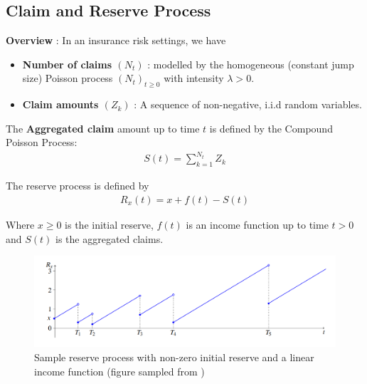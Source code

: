 \subsection{Claim and Reserve Process}
\textbf{Overview} : In an insurance risk settings, we have
\begin{itemize}
    \item \textbf{Number of claims $(N_t)$} : modelled by the homogeneous (constant jump size) Poisson process $(N_t)_{t\ge0}$ with intensity $\lambda > 0$.
    \item \textbf{Claim amounts $(Z_k)$} : A sequence of non-negative, i.i.d random variables.
\end{itemize}

\begin{definition}
    The \textbf{Aggregated claim} amount up to time $t$ is defined by the Compound Poisson Process:
    \begin{align*}
        S(t) = \sum_{k=1}^{N_t} Z_k
    \end{align*}
\end{definition}

\begin{definition}
    The reserve process is defined by
    \begin{align*}
        R_x(t) = x + f(t) - S(t)
    \end{align*}

    \noindent Where $x\ge0$ is the initial reserve, $f(t)$ is an income function up to time $t>0$ and $S(t)$ is the aggregated claims. 
\end{definition}

\begin{figure}[ht]
    \centering
    \includegraphics[width=\textwidth]{figures/sample_reserve_process.png}
    \caption{Sample reserve process with non-zero initial reserve and a linear income function (figure sampled from \cite{book:privault})}
    \label{fig:sample-reserve-process}
\end{figure}

